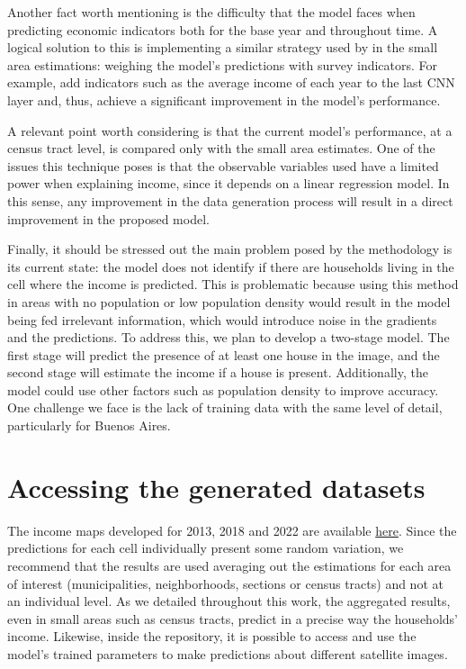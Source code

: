 \documentclass[conference]{IEEEtran}
\begin{document}
Another fact worth mentioning is the difficulty that the model faces when predicting economic indicators both for the base year and throughout time. A logical solution to this is implementing a similar strategy used by \citet{censusEB} in the small area estimations: weighing the model's predictions with survey indicators. For example, \citet{Khachiyan2022} add indicators such as the average income of each year to the last CNN layer and, thus, achieve a significant improvement in the model’s performance.

A relevant point worth considering is that the current model’s performance, at a census tract level, is compared only with the small area estimates. One of the issues this technique poses is that the observable variables used have a limited power when explaining income, since it depends on a linear regression model. In this sense, any improvement in the data generation process will result in a direct improvement in the proposed model.

Finally, it should be stressed out the main problem posed by the methodology is its current state: the model does not identify if there are households living in the cell where the income is predicted. This is problematic because using this method in areas with no population or low population density would result in the model being fed irrelevant information, which would introduce noise in the gradients and the predictions. To address this, we plan to develop a two-stage model. The first stage will predict the presence of at least one house in the image, and the second stage will estimate the income if a house is present. Additionally, the model could use other factors such as population density to improve accuracy. One challenge we face is the lack of training data with the same level of detail, particularly for Buenos Aires.

\section{Accessing the generated datasets}\label{sec:disponibilizacion}

The income maps developed for 2013, 2018 and 2022 are available \href{https://zenodo.org/records/11200070?token=eyJhbGciOiJIUzUxMiJ9.eyJpZCI6IjNhYWNhMDRiLTMwYTEtNDEwMy04MDIwLTA3ZDEzMTlmZTgwYiIsImRhdGEiOnt9LCJyYW5kb20iOiI2MWU4ODAwZjNlYTk0ZGRlOWU1MjIyZWY1YTU5OTk1MyJ9.KvBZ93q8Vt13e0eFxB5mFxBHmuGBZja0pfk4Gse1x0rXCTLioCvFLoXTpD7HkCQCUBpMxuDlL_tqsk8YjJqGMQ}{here}. Since the predictions for each cell individually present some random variation, we recommend that the results are used averaging out the estimations for each area of interest (municipalities, neighborhoods, sections or census tracts) and not at an individual level. As we detailed throughout this work, the aggregated results, even in small areas such as census tracts, predict in a precise way the households’ income. Likewise, inside the repository, it is possible to access and use the model’s trained parameters to make predictions about different satellite images.
\end{document}

